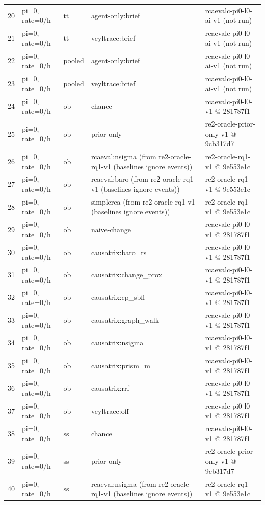 \begin{longtable}{@{}r>{\raggedright\arraybackslash}p{48.0pt}>{\raggedright\arraybackslash}p{18.0pt}>{\raggedright\arraybackslash}p{108.0pt}>{\raggedright\arraybackslash}p{105.0pt}@{}}
20 & pi=0, rate=0/h & tt & agent-only:brief & rcaevalc-pi0-l0-ai-v1 (not run) \\
21 & pi=0, rate=0/h & tt & veyltrace:brief & rcaevalc-pi0-l0-ai-v1 (not run) \\
22 & pi=0, rate=0/h & pooled & agent-only:brief & rcaevalc-pi0-l0-ai-v1 (not run) \\
23 & pi=0, rate=0/h & pooled & veyltrace:brief & rcaevalc-pi0-l0-ai-v1 (not run) \\
24 & pi=0, rate=0/h & ob & chance & rcaevalc-pi0-l0-v1 @ 281787f1 \\
25 & pi=0, rate=0/h & ob & prior-only & re2-oracle-prior-only-v1 @ 9cb317d7 \\
26 & pi=0, rate=0/h & ob & rcaeval:nsigma (from re2-oracle-rq1-v1 (baselines ignore events)) & re2-oracle-rq1-v1 @ 9e553e1c \\
27 & pi=0, rate=0/h & ob & rcaeval:baro (from re2-oracle-rq1-v1 (baselines ignore events)) & re2-oracle-rq1-v1 @ 9e553e1c \\
28 & pi=0, rate=0/h & ob & simplerca (from re2-oracle-rq1-v1 (baselines ignore events)) & re2-oracle-rq1-v1 @ 9e553e1c \\
29 & pi=0, rate=0/h & ob & naive-change & rcaevalc-pi0-l0-v1 @ 281787f1 \\
30 & pi=0, rate=0/h & ob & causatrix:baro\_rs & rcaevalc-pi0-l0-v1 @ 281787f1 \\
31 & pi=0, rate=0/h & ob & causatrix:change\_prox & rcaevalc-pi0-l0-v1 @ 281787f1 \\
32 & pi=0, rate=0/h & ob & causatrix:cp\_sbfl & rcaevalc-pi0-l0-v1 @ 281787f1 \\
33 & pi=0, rate=0/h & ob & causatrix:graph\_walk & rcaevalc-pi0-l0-v1 @ 281787f1 \\
34 & pi=0, rate=0/h & ob & causatrix:nsigma & rcaevalc-pi0-l0-v1 @ 281787f1 \\
35 & pi=0, rate=0/h & ob & causatrix:prism\_m & rcaevalc-pi0-l0-v1 @ 281787f1 \\
36 & pi=0, rate=0/h & ob & causatrix:rrf & rcaevalc-pi0-l0-v1 @ 281787f1 \\
37 & pi=0, rate=0/h & ob & veyltrace:off & rcaevalc-pi0-l0-v1 @ 281787f1 \\
38 & pi=0, rate=0/h & ss & chance & rcaevalc-pi0-l0-v1 @ 281787f1 \\
39 & pi=0, rate=0/h & ss & prior-only & re2-oracle-prior-only-v1 @ 9cb317d7 \\
40 & pi=0, rate=0/h & ss & rcaeval:nsigma (from re2-oracle-rq1-v1 (baselines ignore events)) & re2-oracle-rq1-v1 @ 9e553e1c \\

\end{longtable}
